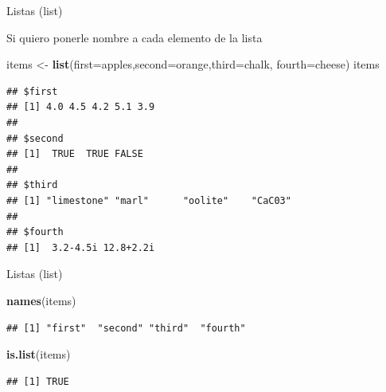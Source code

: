 \documentclass[ignorenonframetext,]{beamer}
\newenvironment{Shaded}{\begin{snugshade}}{\end{snugshade}}
\newcommand{\KeywordTok}[1]{\textcolor[rgb]{0.13,0.29,0.53}{\textbf{#1}}}
\newcommand{\DataTypeTok}[1]{\textcolor[rgb]{0.13,0.29,0.53}{#1}}
\newcommand{\StringTok}[1]{\textcolor[rgb]{0.31,0.60,0.02}{#1}}
\newcommand{\NormalTok}[1]{#1}
\begin{document}
\begin{frame}[fragile]{Listas (list)}

Si quiero ponerle nombre a cada elemento de la lista

\begin{Shaded}
\begin{Highlighting}[]
\NormalTok{items <-}\StringTok{ }\KeywordTok{list}\NormalTok{(}\DataTypeTok{first=}\NormalTok{apples,}\DataTypeTok{second=}\NormalTok{orange,}\DataTypeTok{third=}\NormalTok{chalk,}
              \DataTypeTok{fourth=}\NormalTok{cheese)}
\NormalTok{items}
\end{Highlighting}
\end{Shaded}

\begin{verbatim}
## $first
## [1] 4.0 4.5 4.2 5.1 3.9
## 
## $second
## [1]  TRUE  TRUE FALSE
## 
## $third
## [1] "limestone" "marl"      "oolite"    "CaC03"    
## 
## $fourth
## [1]  3.2-4.5i 12.8+2.2i
\end{verbatim}

\end{frame}

\begin{frame}[fragile]{Listas (list)}

\begin{Shaded}
\begin{Highlighting}[]
\KeywordTok{names}\NormalTok{(items)}
\end{Highlighting}
\end{Shaded}

\begin{verbatim}
## [1] "first"  "second" "third"  "fourth"
\end{verbatim}

\begin{Shaded}
\begin{Highlighting}[]
\KeywordTok{is.list}\NormalTok{(items)}
\end{Highlighting}
\end{Shaded}

\begin{verbatim}
## [1] TRUE
\end{verbatim}

\end{frame}
\end{document}
